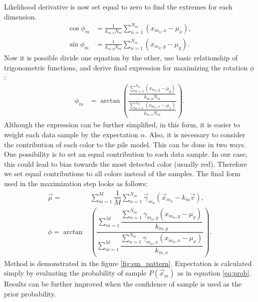 Likelihood derivative is now set equal to zero to find the extremes for each dimension.
\begin{align}
\cos \phi_m &= \frac{1}{k_{m, x}N_m} \sum_{n = 1}^{N_m} \left(  x_{m_n, x} - \mu_x \right)  , \\ 
\sin \phi_m &=  \frac{1}{k_{m, y}N_m} \sum_{n = 1}^{N_m} \left(  x_{m_n, y} - \mu_y \right)  .
\end{align}
Now it is possible divide one equation by the other, use basic relationship of trigonometric functions, and derive final expression for maximizing the rotation $\phi$:
\begin{align}
\phi_m &= \arctan \left( \frac{\dfrac{\sum_{n = 1}^{N_m} \left( x_{m_n, y} - \mu_y \right)}{k_{m, y}N_m} }{ \dfrac{\sum_{n = 1}^{N_m} \left( x_{m_n, x} - \mu_x \right)}{k_{m, x}N_m} }\right).
\end{align}
Although the expression can be further simplified, in this form, it is easier to weight each data sample by the expectation $\alpha$. Also, it is necessary to consider the contribution of each color to the pile model. This can be done in two ways. One possibility is to set an equal contribution to each data sample. In our case, this could lead to bias towards the most detected color (usually red). Therefore we set equal contributions to all colors instead of the samples. The final form used in the maximization step looks as follows:
\begin{align}
\vec{\mu} =& \sum_{m=1}^M \dfrac{1}{M}\sum_{n = 1}^{N_m}  \vec{\gamma}_{m_n} \left( \vec{x}_{m_n} - k_m \vec{v} \right) , \\
\phi = \arctan & \left( \dfrac{\sum_{m=1}^{M} \dfrac{\sum_{n = 1}^{N_m} \gamma_{m_n, y}(x_{m_n, y} - \mu_y)}{k_{m, y} } }{\sum_{m=1}^{M} \dfrac{\sum_{n = 1}^{N_m} \gamma_{m_n, x} (x_{m_n, x} - \mu_x) }{k_{m, x}} }\right).
\end{align}
Method is demonstrated in the figure \ref{fig:em_pattern}. Expectation is calculated simply by evaluating the probability of sample $P(\vec{x}_m)$ as in equation \ref{eq:prob}. Results can be further improved when the confidence of sample is used as the prior probability.

